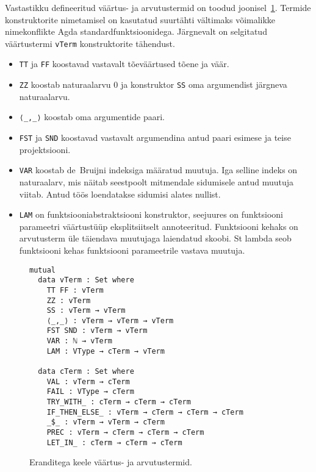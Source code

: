 \documentclass[a4paper,12pt]{article}
\begin{document}
Vastastikku defineeritud väärtus- ja arvutustermid on toodud joonisel~\ref{fig:exc.raw}.
Termide konstruktorite nimetamisel on kasutatud suurtähti vältimaks võimalikke nimekonflikte Agda standardfunktsioonidega.
Järgnevalt on selgitatud väärtustermi {\tt vTerm} konstruktorite tähendust.
\begin{itemize}
\item {\tt TT} ja {\tt FF} koostavad vastavalt tõeväärtused tõene ja väär.
\item {\tt ZZ} koostab naturaalarvu 0 ja konstruktor {\tt SS} oma argumendist järgneva naturaalarvu.
\item {\tt ⟨_,_⟩} koostab oma argumentide paari.
\item {\tt FST} ja {\tt SND} koostavad vastavalt argumendina antud paari esimese ja teise projektsiooni.
\item {\tt VAR} koostab de~Bruijni indeksiga määratud muutuja. Iga selline indeks on naturaalarv, mis näitab seestpoolt mitmendale sidumisele antud muutuja viitab. Antud töös loendatakse sidumisi alates nullist.
\item {\tt LAM} on funktsiooniabstraktsiooni konstruktor, seejuures on funktsiooni parameetri väärtustüüp eksplitsiitselt annoteeritud. Funktsiooni kehaks on arvutusterm üle täiendava muutujaga laiendatud skoobi. St lambda seob funktsiooni kehas funktsiooni parameetrile vastava muutuja.
\end{itemize}
\begin{figure}
  \begin{BVerbatim}
mutual
  data vTerm : Set where
    TT FF : vTerm
    ZZ : vTerm
    SS : vTerm → vTerm
    ⟨_,_⟩ : vTerm → vTerm → vTerm
    FST SND : vTerm → vTerm
    VAR : ℕ → vTerm
    LAM : VType → cTerm → vTerm

  data cTerm : Set where
    VAL : vTerm → cTerm
    FAIL : VType → cTerm
    TRY_WITH_ : cTerm → cTerm → cTerm
    IF_THEN_ELSE_ : vTerm → cTerm → cTerm → cTerm
    _$_ : vTerm → vTerm → cTerm
    PREC : vTerm → cTerm → cTerm → cTerm
    LET_IN_ : cTerm → cTerm → cTerm
  \end{BVerbatim}
  \caption{Eranditega keele väärtus- ja arvutustermid.}
  \label{fig:exc.raw}
\end{figure}
\end{document}
